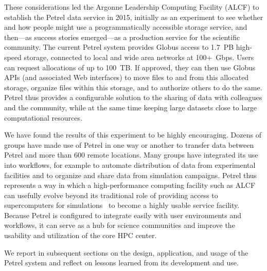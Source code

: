 \documentclass[sigconf]{acmart}
\begin{document}
These considerations led the Argonne Leadership Computing Facility (ALCF)
to establish the Petrel data service in 2015,
initially as an experiment to see whether and how people
might use a programmatically accessible storage service, 
and then---as success stories emerged---as a production
service for the scientific community.
The current Petrel system provides Globus %
access to 1.7~PB high-speed storage, 
connected to local and wide area networks
at 100+~Gbps.
Users can request allocations of up to 100~TB.
If approved, they can then use Globus APIs (and associated Web interfaces) to  
move files to and from this allocated storage, organize files within this storage, and to authorize others to do the same. 
Petrel thus provides a configurable solution to the sharing of data with colleagues and the community, 
while at the  same time keeping large datasets close to large computational resources.

We have found the results of this experiment to be highly encouraging.
Dozens of groups have made use of Petrel in one way or another to transfer
data between Petrel and more than 600 remote locations.
Many groups have integrated its use into workflows, for example to
automate distribution of data from experimental facilities and to 
organize and share data from simulation campaigns.
Petrel thus represents a way in which a high-performance computing facility such as ALCF can usefully evolve
beyond its traditional role of providing access to supercomputers for simulations~\cite{UrPa16}
to become a highly usable service facility. 
Because Petrel is configured to integrate easily with user environments and workflows,
it can serve as a hub for science communities and 
improve the usability and utilization of the core HPC center. 

We report in subsequent sections on the design, application, and usage of the Petrel system
and reflect on lessons learned from its development and use.


%
\end{document}
